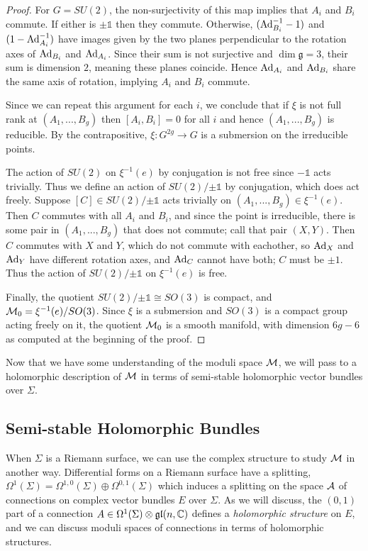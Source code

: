 \begin{proof}
		For $G=SU(2)$, the non-surjectivity of this map implies that $A_i$ and $B_i$ commute. If either is $\pm\mathds{1}$ then they commute. Otherwise, $(\text{Ad}_{B_i}^{-1}-1)$ and $(1-\text{Ad}_{A_i}^{-1})$ have images given by the two planes perpendicular to the rotation axes of $\text{Ad}_{B_i}$ and $\text{Ad}_{A_i}$. Since their sum is not surjective and $\dim\mathfrak{g}=3$, their sum is dimension $2$, meaning these planes coincide. Hence $\text{Ad}_{A_i}$ and $\text{Ad}_{B_i}$ share the same axis of rotation, implying $A_i$ and $B_i$ commute.
		
		Since we can repeat this argument for each $i$, we conclude that if $\xi$ is not full rank at $(A_1,...,B_g)$ then $[A_i,B_i]=0$ for all $i$ and hence $(A_1,...,B_g)$ is reducible. By the contrapositive, $\xi:G^{2g}\to G$ is a submersion on the irreducible points. 
		
		The action of $SU(2)$ on $\xi^{-1}(e)$ by conjugation is not free since $-\mathds{1}$ acts trivially. Thus we define an action of $SU(2)/{\pm \mathds{1}}$ by conjugation, which does act freely. Suppose $[C]\in SU(2)/{\pm \mathds{1}}$ acts trivially on $(A_1,...,B_g)\in \xi^{-1}(e)$. Then $C$ commutes with all $A_i$ and $B_i$, and since the point is irreducible, there is some pair in $(A_1,...,B_g)$ that does not commute; call that pair $(X,Y)$. Then $C$ commutes with $X$ and $Y$, which do not commute with eachother, so $\text{Ad}_X$ and $\text{Ad}_Y$ have different rotation axes, and $\text{Ad}_C$ cannot have both; $C$ must be $\pm 1$. Thus the action of $SU(2)/{\pm \mathds{1}}$ on $\xi^{-1}(e)$ is free.
		
		Finally, the quotient $SU(2)/{\pm \mathds{1}} \cong SO(3)$ is compact, and $\mathcal{M}_0 = \xi^{-1}(e)/SO(3)$. Since $\xi$ is a submersion and $SO(3)$ is a compact group acting freely on it, the quotient $\mathcal{M}_0$ is a smooth manifold, with dimension $6g-6$ as computed at the beginning of the proof.
	\end{proof}
	Now that we have some understanding of the moduli space $\mathcal{M}$, we will pass to a holomorphic description of $\mathcal{M}$ in terms of semi-stable holomorphic vector bundles over $\Sigma$.
	\subsection{Semi-stable Holomorphic Bundles}
	When $\Sigma$ is a Riemann surface, we can use the complex structure to study $\mathcal{M}$ in another way. Differential forms on a Riemann surface have a splitting, $\Omega^1(\Sigma) = \Omega^{1,0}(\Sigma)\oplus \Omega^{0,1}(\Sigma)$ which induces a splitting on the space $\mathcal{A}$ of connections on complex vector bundles $E$ over $\Sigma$. As we will discuss, the $(0,1)$ part of a connection $A\in \Omega^1(\Sigma)\otimes \mathfrak{gl}(n,\mathbb{C})$ defines a \emph{holomorphic structure} on $E$, and we can discuss moduli spaces of connections in terms of holomorphic structures.
	
